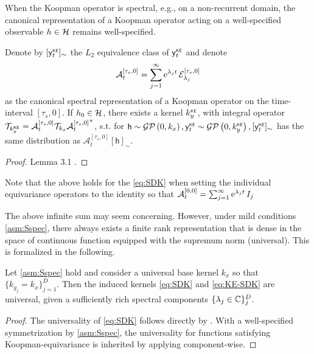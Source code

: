 When the Koopman operator is spectral, e.g., on a non-recurrent domain, the canonical representation of a Koopman operator acting on a well-specified observable ${h} \in \mathcal{H}$ remains well-specified.
\begin{lemma}
  Denote by $[\mathsf{y}_t^{{\textsf{\tiny KE}}}]_{\sim}$ the $L_2$ equivalence class of $\mathsf{y}_t^{{\textsf{\tiny KE}}}$ and denote 
  \begin{align}
    \mathcal{A}^{[\tau_s,0]}_t = \sum^{\infty}_{j=1}\operatorname{e}^{\lambda_j t} \mathcal{E}_{\lambda_j}^{[\tau_s,0]}
\end{align}
  as the canonical spectral representation of a Koopman operator on the time-interval $[\tau_s,0]$. If $h_0 \in \mathcal{H}$, there exists a kernel $k_y^{{\textsf{\tiny KE}}}$, with integral operator $\mathcal{T}_{k_y^{{\textsf{\tiny KE}}}}={ \mathcal{A}^{[\tau_s,0]}_t} \mathcal{T}_{k_x} {\mathcal{A}^{[\tau_s,0]}_t}^* $, s.t. for $\mathsf{h} \sim \mathcal{GP}\left(0, k_{x}\right), \mathsf{y}_t^{{\textsf{\tiny KE}}} \sim \mathcal{GP}\left(0, k_y^{{\textsf{\tiny KE}}}\right),[\mathsf{y}_t^{{\textsf{\tiny KE}}}]_{\sim}$ has the same distribution as $ \mathcal{A}^{[\tau_s,0]}_t[\mathsf{h}]_{\sim}$.
  \begin{proof}
      Lemma 3.1 \citep{Wang2022}.
  \end{proof}
\end{lemma}

\begin{remark}
    Note  that the above holds for the \eqref{eq:SDK} when setting the individual equivariance operators to the identity so that  $\mathcal{A}^{[0,0]}_t = \sum^{\infty}_{j=1}\operatorname{e}^{\lambda_j t}I_j$ 
\end{remark}

The above infinite sum may seem concerning. However, under mild conditions \ref{asm:Sspec}, there always exists a finite rank representation that is dense in the space of continuous function equipped with the supremum norm (universal). This is formalized in the following.

\begin{lemma}[Universality]
Let \ref{asm:Sspec} hold and consider a universal base kernel $k_x$ so that $\{k_{g_j}= k_x\}^D_{j=1}$. Then the induced kernels \eqref{eq:SDK} and \eqref{eq:KE-SDK} are universal, given a sufficiently rich spectral components $\{\lambda_j\in \mathbb{C}\}^{D}_j $.
    \begin{proof}
       The universality of \eqref{eq:SDK} follows directly by \citet[Theorem 2]{Korda2020OptimalControl}. With a well-specified symmetrization by \ref{asm:Sspec}, the universality for functions satisfying Koopman-equivariance is inherited by applying \citet[Theorem 1 (ii)]{KKR_neurips2023} component-wise.
    \end{proof}
\end{lemma}

